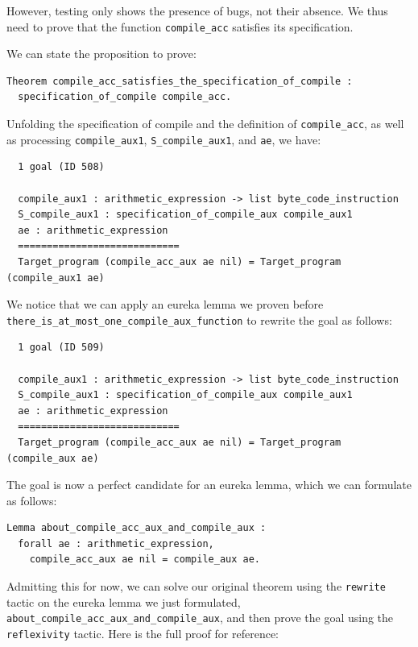 \documentclass{article}
\begin{document}
However, testing only shows the presence of bugs, not their absence. We thus need to prove that the function \texttt{compile\_acc} satisfies its specification.

We can state the proposition to prove:

\begin{lstlisting}
Theorem compile_acc_satisfies_the_specification_of_compile :
  specification_of_compile compile_acc.
\end{lstlisting}

Unfolding the specification of compile and the definition of \texttt{compile\_acc}, as well as processing \texttt{compile\_aux1}, \texttt{S\_compile\_aux1}, and \texttt{ae}, we have:

\begin{lstlisting}
  1 goal (ID 508)
  
  compile_aux1 : arithmetic_expression -> list byte_code_instruction
  S_compile_aux1 : specification_of_compile_aux compile_aux1
  ae : arithmetic_expression
  ============================
  Target_program (compile_acc_aux ae nil) = Target_program (compile_aux1 ae)
\end{lstlisting}

We notice that we can apply an eureka lemma we proven before \texttt{there\_is\_at\_most\_one\_compile\_aux\_function} to rewrite the goal as follows:

\begin{lstlisting}
  1 goal (ID 509)
  
  compile_aux1 : arithmetic_expression -> list byte_code_instruction
  S_compile_aux1 : specification_of_compile_aux compile_aux1
  ae : arithmetic_expression
  ============================
  Target_program (compile_acc_aux ae nil) = Target_program (compile_aux ae)
\end{lstlisting}

The goal is now a perfect candidate for an eureka lemma, which we can formulate as follows:

\begin{lstlisting}
Lemma about_compile_acc_aux_and_compile_aux :
  forall ae : arithmetic_expression,
    compile_acc_aux ae nil = compile_aux ae.
\end{lstlisting}

Admitting this for now, we can solve our original theorem using the \texttt{rewrite} tactic on the eureka lemma we just formulated, \texttt{about\_compile\_acc\_aux\_and\_compile\_aux}, and then prove the goal using the \texttt{reflexivity} tactic. Here is the full proof for reference:
\end{document}
